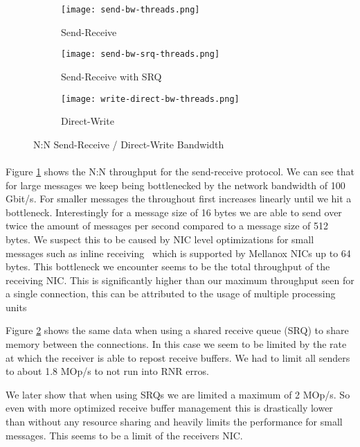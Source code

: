 \begin{figure}[ht]
  \centering
\begin{subfigure}[b]{0.49\textwidth}
  \centering
  \texttt{[image: send-bw-threads.png]}
  \caption{Send-Receive}
  \label{fig:plot-sndrcv-bw-thread-nosrq}
\end{subfigure}
\begin{subfigure}[b]{0.49\textwidth}
  \centering
  \texttt{[image: send-bw-srq-threads.png]}
  \caption{Send-Receive with SRQ}
  \label{fig:plot-sndrcv-bw-thread-srq}
\end{subfigure}
  \begin{subfigure}[b]{0.48\textwidth}
  \centering
  \texttt{[image: write-direct-bw-threads.png]}
  \caption{Direct-Write}
  \label{fig:plot-wdir-bw-threads}
  \end{subfigure}
\caption{N:N Send-Receive / Direct-Write Bandwidth}
  \label{fig:plot-sndrcv-bw-thread}
\end{figure}


\paragraph{} Figure \ref{fig:plot-sndrcv-bw-thread-nosrq} shows the N:N throughput for the send-receive protocol.
We can see that for large messages we keep being bottlenecked by the network bandwidth of 100 Gbit/s. For smaller
messages the throughout first increases linearly until we hit a bottleneck. Interestingly for a message size 
of 16 bytes we are able to send over twice the amount of messages per second compared to a message size of 512 bytes.
We suspect this to be caused by NIC level optimizations for small messages such as inline receiving~\cite{anuj-guide} which 
is supported by Mellanox NICs up to 64 bytes. This bottleneck we encounter seems to be the total throughput of the 
receiving NIC. This is significantly higher than our maximum throughput seen for a single connection, this can be 
attributed to the usage of multiple processing units~\cite{anuj-guide}


Figure \ref{fig:plot-sndrcv-bw-thread-srq} shows the same data when using a shared receive queue (SRQ) to share memory
between the connections. In this case we seem to be limited by the rate at which the receiver is able to
repost receive buffers. We
had to limit all senders to about 1.8 MOp/s to not run into RNR erros.

We later show that when using SRQs we are limited a maximum of 2 MOp/s. So even with more optimized receive buffer management
this is drastically lower than without any resource sharing and heavily limits the performance for small messages. This seems
to be a limit of the receivers NIC.

